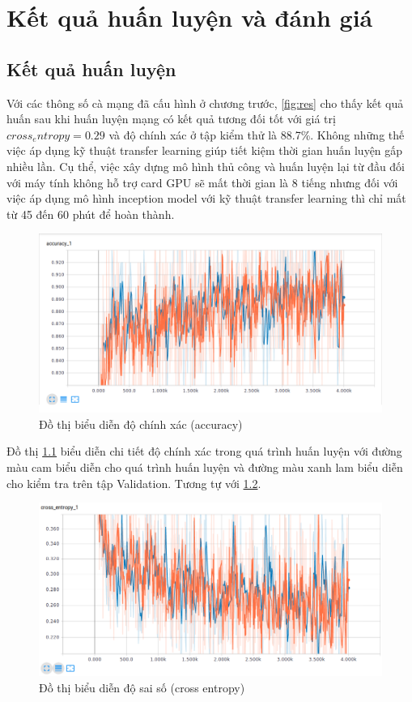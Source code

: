 \chapter{Kết quả huấn luyện và đánh giá}
\section{Kết quả huấn luyện}
Với các thông số cà mạng đã cấu hình ở chương trước, \ref{fig:res} cho thấy kết quả huấn sau khi huấn luyện mạng có kết quả tương đối tốt với giá trị \(cross_entropy = 0.29\) và độ chính xác ở tập kiểm thử là 88.7\%. Không những thế việc áp dụng kỹ thuật transfer learning giúp tiết kiệm thời gian huấn luyện gấp nhiều lần. Cụ thể, việc xây dựng mô hình thủ công và huấn luyện lại từ đầu đối với máy tính không hỗ trợ card GPU sẽ mất thời gian là 8 tiếng nhưng đối với việc áp dụng mô hình inception model với kỹ thuật transfer learning thì chỉ mất từ 45 đến 60 phút để hoàn thành.\par
\pagebreak
	\begin{figure}[h!]
		\centering
		\includegraphics[scale=0.5]{charts/accuracy.png}
		\caption{Đồ thị biểu diễn độ chính xác (accuracy)}
		\label{fig:accuracy}
	\end{figure}

Đồ thị \ref{fig:accuracy} biểu diễn chi tiết độ chính xác trong quá trình huấn luyện với đường màu cam biểu diễn cho quá trình huấn luyện và đường màu xanh lam biểu diễn cho kiểm tra trên tập Validation. Tương tự với \ref{fig:cross_entropy}.
	\pagebreak
	\begin{figure}[h!]
		\centering
		\includegraphics[scale=0.5]{charts/cross-entropy.png}
		\caption{Đồ thị biểu diễn độ sai số (cross entropy)}
		\label{fig:cross_entropy}
	\end{figure}

